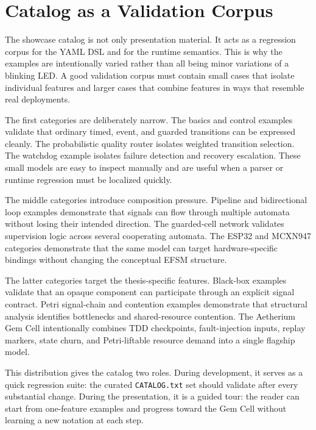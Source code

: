 \section{Catalog as a Validation Corpus}
\label{sec:catalog-validation-corpus}

The showcase catalog is not only presentation material. It acts as a regression corpus for the YAML DSL and for the runtime semantics. This is why the examples are intentionally varied rather than all being minor variations of a blinking LED. A good validation corpus must contain small cases that isolate individual features and larger cases that combine features in ways that resemble real deployments.

The first categories are deliberately narrow. The basics and control examples validate that ordinary timed, event, and guarded transitions can be expressed cleanly. The probabilistic quality router isolates weighted transition selection. The watchdog example isolates failure detection and recovery escalation. These small models are easy to inspect manually and are useful when a parser or runtime regression must be localized quickly.

The middle categories introduce composition pressure. Pipeline and bidirectional loop examples demonstrate that signals can flow through multiple automata without losing their intended direction. The guarded-cell network validates supervision logic across several cooperating automata. The ESP32 and MCXN947 categories demonstrate that the same model can target hardware-specific bindings without changing the conceptual EFSM structure.

The latter categories target the thesis-specific features. Black-box examples validate that an opaque component can participate through an explicit signal contract. Petri signal-chain and contention examples demonstrate that structural analysis identifies bottlenecks and shared-resource contention. The Aetherium Gem Cell intentionally combines TDD checkpoints, fault-injection inputs, replay markers, state churn, and Petri-liftable resource demand into a single flagship model.

This distribution gives the catalog two roles. During development, it serves as a quick regression suite: the curated \texttt{CATALOG.txt} set should validate after every substantial change. During the presentation, it is a guided tour: the reader can start from one-feature examples and progress toward the Gem Cell without learning a new notation at each step.


